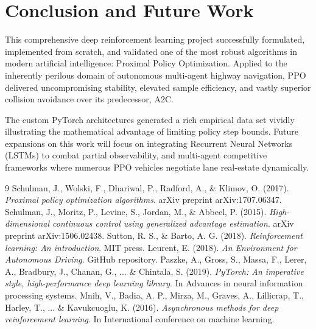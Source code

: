 \documentclass[12pt, a4paper]{article}
\begin{document}
\section{Conclusion and Future Work}
This comprehensive deep reinforcement learning project successfully formulated, implemented from scratch, and validated one of the most robust algorithms in modern artificial intelligence: Proximal Policy Optimization. Applied to the inherently perilous domain of autonomous multi-agent highway navigation, PPO delivered uncompromising stability, elevated sample efficiency, and vastly superior collision avoidance over its predecessor, A2C. 

The custom PyTorch architectures generated a rich empirical data set vividly illustrating the mathematical advantage of limiting policy step bounds. Future expansions on this work will focus on integrating Recurrent Neural Networks (LSTMs) to combat partial observability, and multi-agent competitive frameworks where numerous PPO vehicles negotiate lane real-estate dynamically.

\newpage
\begin{thebibliography}{9}
\large
{} Schulman, J., Wolski, F., Dhariwal, P., Radford, A., \& Klimov, O. (2017). \emph{Proximal policy optimization algorithms}. arXiv preprint arXiv:1707.06347.
 Schulman, J., Moritz, P., Levine, S., Jordan, M., \& Abbeel, P. (2015). \emph{High-dimensional continuous control using generalized advantage estimation}. arXiv preprint arXiv:1506.02438.
 Sutton, R. S., \& Barto, A. G. (2018). \emph{Reinforcement learning: An introduction}. MIT press.
 Leurent, E. (2018). \emph{An Environment for Autonomous Driving}. GitHub repository.
 Paszke, A., Gross, S., Massa, F., Lerer, A., Bradbury, J., Chanan, G., ... \& Chintala, S. (2019). \emph{PyTorch: An imperative style, high-performance deep learning library}. In Advances in neural information processing systems.
 Mnih, V., Badia, A. P., Mirza, M., Graves, A., Lillicrap, T., Harley, T., ... \& Kavukcuoglu, K. (2016). \emph{Asynchronous methods for deep reinforcement learning}. In International conference on machine learning.
\end{thebibliography}
\end{document}
